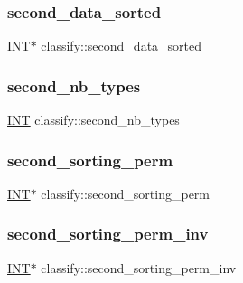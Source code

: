 \subsubsection{\texorpdfstring{second\+\_\+data\+\_\+sorted}{second\_data\_sorted}}
{\footnotesize\ttfamily \mbox{\hyperlink{galois_8h_a09fddde158a3a20bd2dcadb609de11dc}{I\+NT}}$\ast$ classify\+::second\+\_\+data\+\_\+sorted}

\mbox{\label{classclassify_a5c6780c483021fc763b41fdf883a7641}} 
\subsubsection{\texorpdfstring{second\+\_\+nb\+\_\+types}{second\_nb\_types}}
{\footnotesize\ttfamily \mbox{\hyperlink{galois_8h_a09fddde158a3a20bd2dcadb609de11dc}{I\+NT}} classify\+::second\+\_\+nb\+\_\+types}

\mbox{\label{classclassify_aacfa164863532295c85e2d46a00ab62f}} 
\subsubsection{\texorpdfstring{second\+\_\+sorting\+\_\+perm}{second\_sorting\_perm}}
{\footnotesize\ttfamily \mbox{\hyperlink{galois_8h_a09fddde158a3a20bd2dcadb609de11dc}{I\+NT}}$\ast$ classify\+::second\+\_\+sorting\+\_\+perm}

\mbox{\label{classclassify_ab8a41e6f21560b980cc46ae1f9b837b2}} 
\subsubsection{\texorpdfstring{second\+\_\+sorting\+\_\+perm\+\_\+inv}{second\_sorting\_perm\_inv}}
{\footnotesize\ttfamily \mbox{\hyperlink{galois_8h_a09fddde158a3a20bd2dcadb609de11dc}{I\+NT}}$\ast$ classify\+::second\+\_\+sorting\+\_\+perm\+\_\+inv}

